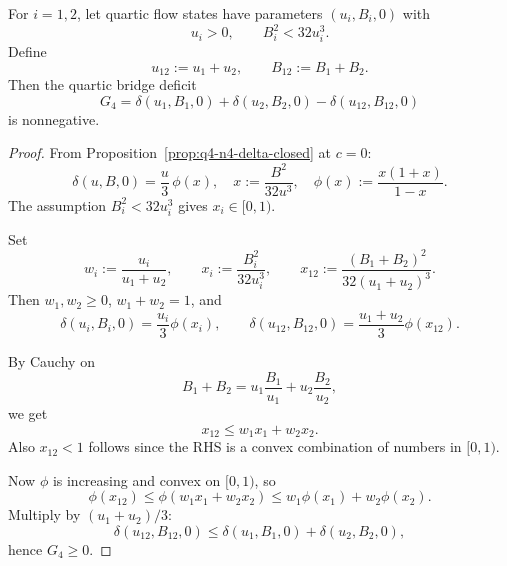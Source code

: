 \begin{proposition}[Closed $c=0$ quartic subfamily of the Route-1 bridge]\label{prop:q4-n4-c0-closed}
For $i=1,2$, let quartic flow states have parameters $(u_i,B_i,0)$ with
\[
u_i>0,\qquad B_i^2<32u_i^3.
\]
Define
\[
u_{12}:=u_1+u_2,\qquad B_{12}:=B_1+B_2.
\]
Then the quartic bridge deficit
\[
G_4=\delta(u_1,B_1,0)+\delta(u_2,B_2,0)-\delta(u_{12},B_{12},0)
\]
is nonnegative.
\end{proposition}

\begin{proof}
From Proposition~\ref{prop:q4-n4-delta-closed} at $c=0$:
\[
\delta(u,B,0)=\frac{u}{3}\,\phi(x),
\quad
x:=\frac{B^2}{32u^3},
\quad
\phi(x):=\frac{x(1+x)}{1-x}.
\]
The assumption $B_i^2<32u_i^3$ gives $x_i\in[0,1)$.

Set
\[
w_i:=\frac{u_i}{u_1+u_2},\qquad
x_i:=\frac{B_i^2}{32u_i^3},\qquad
x_{12}:=\frac{(B_1+B_2)^2}{32(u_1+u_2)^3}.
\]
Then $w_1,w_2\ge 0$, $w_1+w_2=1$, and
\[
\delta(u_i,B_i,0)=\frac{u_i}{3}\phi(x_i),\qquad
\delta(u_{12},B_{12},0)=\frac{u_1+u_2}{3}\phi(x_{12}).
\]

By Cauchy on
\[
B_1+B_2=u_1\frac{B_1}{u_1}+u_2\frac{B_2}{u_2},
\]
we get
\[
x_{12}\le w_1x_1+w_2x_2.
\]
Also $x_{12}<1$ follows since the RHS is a convex combination of numbers in $[0,1)$.

Now $\phi$ is increasing and convex on $[0,1)$, so
\[
\phi(x_{12})
\le
\phi(w_1x_1+w_2x_2)
\le
w_1\phi(x_1)+w_2\phi(x_2).
\]
Multiply by $(u_1+u_2)/3$:
\[
\delta(u_{12},B_{12},0)
\le
\delta(u_1,B_1,0)+\delta(u_2,B_2,0),
\]
hence $G_4\ge 0$.
\end{proof}

